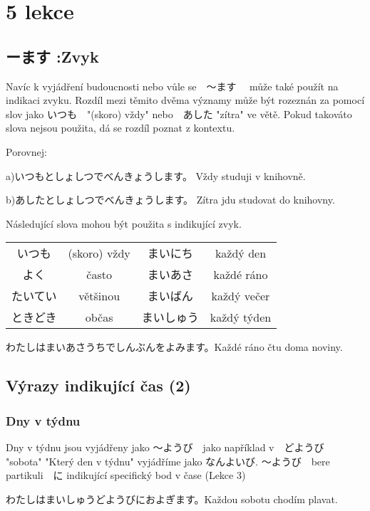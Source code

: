 \section{5 lekce}
\label{sec:lekce_5}

\subsection{ーます :Zvyk}

Navíc k vyjádření budoucnosti nebo vůle se　〜ます　 může také použít na indikaci zvyku. Rozdíl mezi těmito dvěma významy může být rozeznán za pomocí slov jako いつも　"(skoro) vždy" nebo　あした "zítra" ve větě. Pokud takováto slova nejsou použita, dá se rozdíl poznat z kontextu.

Porovnej:

a)いつもとしょしつでべんきょうします。 Vždy studuji v knihovně.

b)あしたとしょしつでべんきょうします。 Zítra jdu studovat do knihovny.

Následující slova mohou být použita s indikující zvyk. 

\begin{center}
\begin{tabular}{cccc}
いつも&(skoro) vždy&まいにち&každý den\\
よく&často&まいあさ&každé ráno\\
たいてい&většinou&まいばん&každý večer\\
ときどき&občas&まいしゅう&každý týden\\
\end{tabular}
\end{center}

わたしはまいあさうちでしんぶんをよみます。Každé ráno čtu doma noviny.

\subsection{Výrazy indikující čas (2)}

\subsubsection{Dny v týdnu}
Dny v týdnu jsou vyjádřeny jako 〜ようび　jako například v　どようび　 "sobota" "Který den v týdnu" vyjádříme jako なんよいび. 〜ようび　bere partikuli　に indikující specifický bod v čase (Lekce 3) 

わたしはまいしゅうどようびにおよぎます。Každou sobotu chodím plavat.


